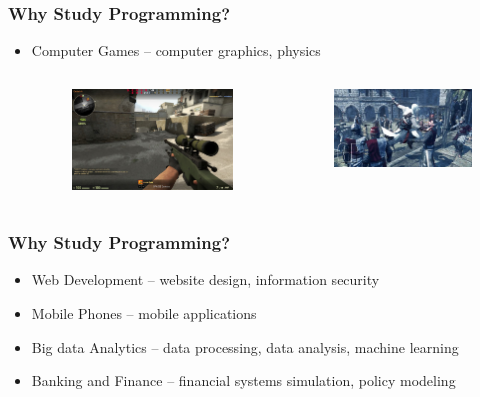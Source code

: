 \documentclass{beamer}
\begin{document}
\begin{frame}
    \frametitle{Why Study Programming?}
    \begin{itemize}
        \item Computer Games -- computer graphics, physics
        \begin{columns}
            \begin{figure}
                \centering
                \includegraphics[scale=0.36]{games}
            \end{figure}
            \begin{figure}
                \centering
                \includegraphics[scale=0.31]{games2}
            \end{figure}
        \end{columns}
    \end{itemize}
\end{frame}

\begin{frame}
    \frametitle{Why Study Programming?}
    \begin{itemize}
        \item Web Development -- website design, information security
        \item Mobile Phones -- mobile applications
        \item Big data Analytics -- data processing, data analysis, machine learning
        \item Banking and Finance -- financial systems simulation, policy modeling
    \end{itemize}
\end{frame}
\end{document}
